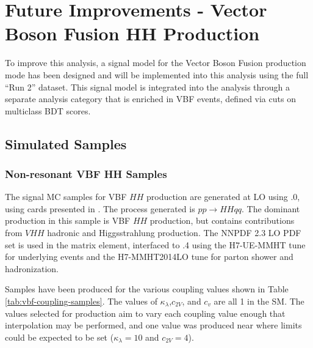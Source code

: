 
\chapter{Future Improvements - Vector Boson Fusion HH Production}

To improve this analysis, a signal model for the Vector Boson Fusion production mode has been designed and will be implemented into this analysis using the full ``Run 2'' dataset. This signal model is integrated into the analysis through a separate analysis category that is enriched in VBF events, defined via cuts on multiclass \gls{BDT} scores.

\section{Simulated Samples}

\subsection{Non-resonant VBF HH Samples}

The signal MC samples for VBF $HH$ production are generated at LO using .0, using cards presented in \cite{vbfhh}. The process generated is $pp \rightarrow HHqq$. The dominant production in this sample is VBF $HH$ production, but contains contributions from $VHH$  hadronic and Higgsstrahlung production. The NNPDF 2.3 LO PDF set \cite{NNPDF} is used in the matrix element, interfaced to .4 using the H7-UE-MMHT tune for underlying events and the H7-MMHT2014LO tune for parton shower and hadronization.

Samples have been produced for the various coupling values shown in Table \ref{tab:vbf-coupling-samples}. The values of $\kappa_\lambda$,$c_{2V}$, and $c_{v}$ are all 1 in the SM. The values selected for production aim to vary each coupling value enough that interpolation may be performed, and one value was produced near where limits could be expected to be set ($\kappa_\lambda = 10$ and $c_{2V}=4$).

